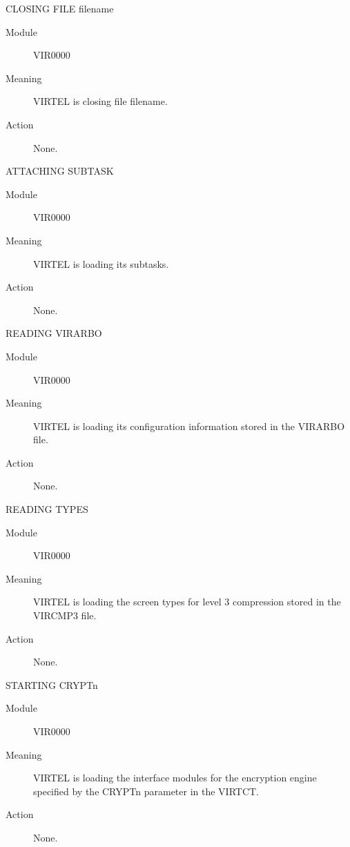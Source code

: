 \documentclass[letterpaper,10pt,english]{sphinxmanual}
\begin{document}
CLOSING FILE filename
\begin{description}
\item[{Module}] \leavevmode
VIR0000

\item[{Meaning}] \leavevmode
VIRTEL is closing file filename.

\item[{Action}] \leavevmode
None.

\end{description}

ATTACHING SUBTASK
\begin{description}
\item[{Module}] \leavevmode
VIR0000

\item[{Meaning}] \leavevmode
VIRTEL is loading its subtasks.

\item[{Action}] \leavevmode
None.

\end{description}

READING VIRARBO
\begin{description}
\item[{Module}] \leavevmode
VIR0000

\item[{Meaning}] \leavevmode
VIRTEL is loading its configuration information stored in the VIRARBO file.

\item[{Action}] \leavevmode
None.

\end{description}

READING TYPES
\begin{description}
\item[{Module}] \leavevmode
VIR0000

\item[{Meaning}] \leavevmode
VIRTEL is loading the screen types for level 3 compression stored in the VIRCMP3 file.

\item[{Action}] \leavevmode
None.

\end{description}

STARTING CRYPTn
\begin{description}
\item[{Module}] \leavevmode
VIR0000

\item[{Meaning}] \leavevmode
VIRTEL is loading the interface modules for the encryption engine specified by the CRYPTn parameter in the VIRTCT.

\item[{Action}] \leavevmode
None.

\end{description}
\end{document}
